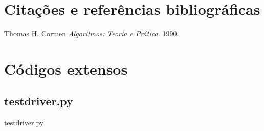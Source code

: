 \documentclass[12pt,a4paper,twoside]{report}
\begin{document}
\chapter{Citações e referências bibliográficas}
	\begin{thebibliography}{1}
		
		 Thomas H. Cormen {\em 
			Algoritmos: Teoria e Prática.
		}  1990.
		
	\end{thebibliography}







\clearpage
{}
\appendix

\chapter{Códigos extensos \label{ap:testdriver}}
\section{testdriver.py}
 {testdriver.py}
\end{document}
